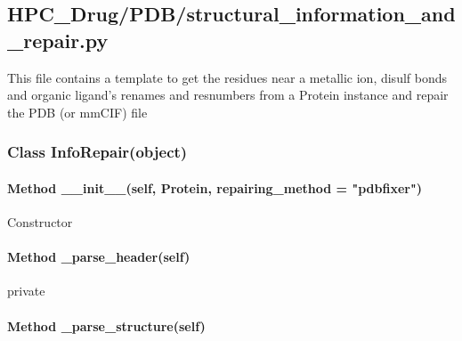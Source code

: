 

\subsection{HPC\_Drug/PDB/structural\_information\_and\_repair.py}

    This file contains a template to get the residues near a metallic ion, disulf bonds and organic ligand's renames and resnumbers from a Protein instance and repair the PDB (or mmCIF) file

    \subsubsection{Class InfoRepair(object)}

        \paragraph{Method \_\_init\_\_(self, Protein, repairing\_method = "pdbfixer")}
        
            Constructor

        \paragraph{Method \_parse\_header(self)}
        
            private

        \paragraph{Method \_parse\_structure(self)}

